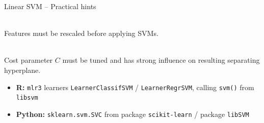 \begin{frame}{Linear SVM -- Practical hints}

\footnotesize

   \\
  Features must be rescaled before applying SVMs.
  
  \medskip
  
   \\
  Cost parameter $C$ must be tuned and has strong influence on resulting 
  separating hyperplane. 

  \medskip

  \begin{itemize}
    \item \textbf{R:} \texttt{mlr3} learners \texttt{LearnerClassifSVM} / 
    \texttt{LearnerRegrSVM}, calling \texttt{svm()} from \texttt{libsvm}
    \item \textbf{Python:} \texttt{sklearn.svm.SVC} from package 
    \texttt{scikit-learn} / package \texttt{libSVM}
  \end{itemize}

\end{frame}
